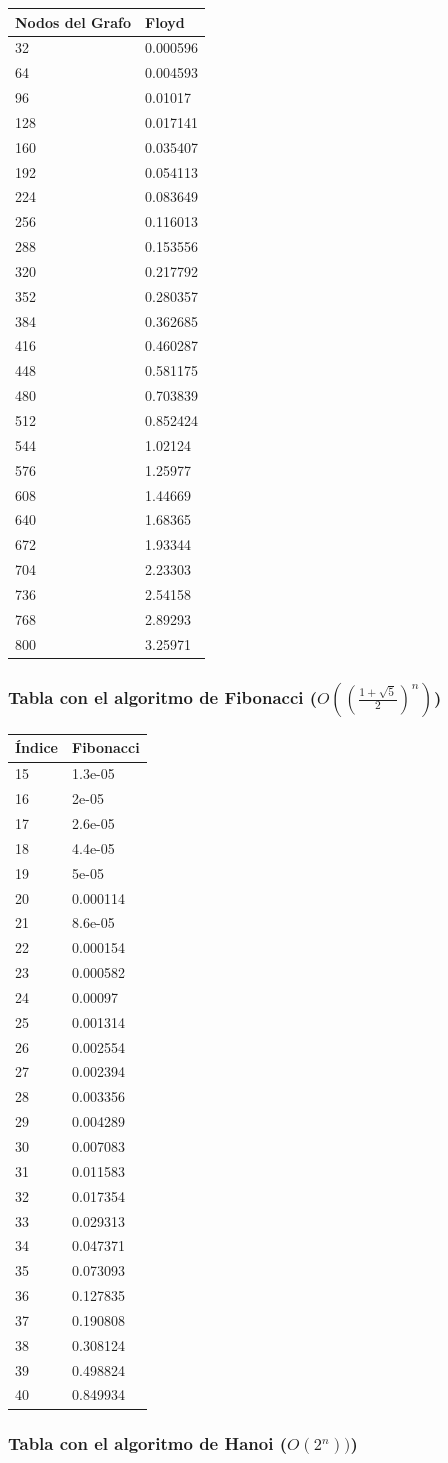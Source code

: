 \documentclass[]{article}
\begin{document}
\begin{longtable}[c]{@{}ll@{}}
\toprule
Nodos del Grafo & Floyd\tabularnewline
\midrule
\endhead
32 & 0.000596\tabularnewline
64 & 0.004593\tabularnewline
96 & 0.01017\tabularnewline
128 & 0.017141\tabularnewline
160 & 0.035407\tabularnewline
192 & 0.054113\tabularnewline
224 & 0.083649\tabularnewline
256 & 0.116013\tabularnewline
288 & 0.153556\tabularnewline
320 & 0.217792\tabularnewline
352 & 0.280357\tabularnewline
384 & 0.362685\tabularnewline
416 & 0.460287\tabularnewline
448 & 0.581175\tabularnewline
480 & 0.703839\tabularnewline
512 & 0.852424\tabularnewline
544 & 1.02124\tabularnewline
576 & 1.25977\tabularnewline
608 & 1.44669\tabularnewline
640 & 1.68365\tabularnewline
672 & 1.93344\tabularnewline
704 & 2.23303\tabularnewline
736 & 2.54158\tabularnewline
768 & 2.89293\tabularnewline
800 & 3.25971\tabularnewline
\bottomrule
\end{longtable}

\subsubsection{Tabla con el algoritmo de Fibonacci
(\(O((\frac{1+\sqrt{5}}{2})^n)\))}\label{tabla-con-el-algoritmo-de-fibonacci-ofrac1sqrt52n}

\begin{longtable}[c]{@{}ll@{}}
\toprule
Índice & Fibonacci\tabularnewline
\midrule
\endhead
15 & 1.3e-05\tabularnewline
16 & 2e-05\tabularnewline
17 & 2.6e-05\tabularnewline
18 & 4.4e-05\tabularnewline
19 & 5e-05\tabularnewline
20 & 0.000114\tabularnewline
21 & 8.6e-05\tabularnewline
22 & 0.000154\tabularnewline
23 & 0.000582\tabularnewline
24 & 0.00097\tabularnewline
25 & 0.001314\tabularnewline
26 & 0.002554\tabularnewline
27 & 0.002394\tabularnewline
28 & 0.003356\tabularnewline
29 & 0.004289\tabularnewline
30 & 0.007083\tabularnewline
31 & 0.011583\tabularnewline
32 & 0.017354\tabularnewline
33 & 0.029313\tabularnewline
34 & 0.047371\tabularnewline
35 & 0.073093\tabularnewline
36 & 0.127835\tabularnewline
37 & 0.190808\tabularnewline
38 & 0.308124\tabularnewline
39 & 0.498824\tabularnewline
40 & 0.849934\tabularnewline
\bottomrule
\end{longtable}

\subsubsection{Tabla con el algoritmo de Hanoi
(\(O(2^n))\))}\label{tabla-con-el-algoritmo-de-hanoi-o2n}
\end{document}
